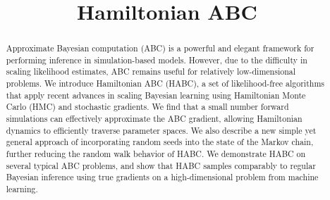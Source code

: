 \documentclass[]{article}
\date{}
\title{Hamiltonian ABC}
\author{} %
\begin{document}
 
	\vskip -0.3in
  
\maketitle

% 
% 
% 
\begin{abstract} 
  Approximate Bayesian computation (ABC) is a powerful and elegant framework for performing inference in simulation-based models.  However, due to the difficulty in scaling likelihood estimates, ABC remains useful for relatively low-dimensional problems. We introduce Hamiltonian ABC (HABC), a set of likelihood-free algorithms that apply recent advances in scaling Bayesian learning using Hamiltonian Monte Carlo (HMC) and stochastic gradients.     We find that a small number forward simulations can effectively approximate the ABC gradient, allowing Hamiltonian dynamics to efficiently traverse parameter spaces.  We also describe a new simple yet general approach of incorporating random seeds into the state of the Markov chain, further reducing the random walk behavior of HABC.  We demonstrate HABC on several typical ABC problems, and show that HABC samples comparably to regular Bayesian inference using true gradients on a high-dimensional problem from machine learning.

\end{abstract}
\end{document}
